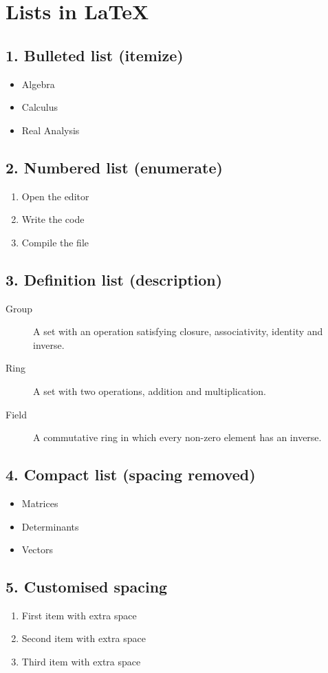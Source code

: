 \documentclass[12pt]{article}
\begin{document}
\section*{Lists in \LaTeX{}}

\subsection*{1. Bulleted list (itemize)}
\begin{itemize}
  \item Algebra
  \item Calculus
  \item Real Analysis
\end{itemize}

\subsection*{2. Numbered list (enumerate)}
\begin{enumerate}
  \item Open the editor
  \item Write the code
  \item Compile the file
\end{enumerate}

\subsection*{3. Definition list (description)}
\begin{description}
  \item[Group] A set with an operation satisfying closure, associativity, identity and inverse.
  \item[Ring] A set with two operations, addition and multiplication.
  \item[Field] A commutative ring in which every non-zero element has an inverse.
\end{description}

\subsection*{4. Compact list (spacing removed)}
\begin{itemize}[noitemsep]
  \item Matrices
  \item Determinants
  \item Vectors
\end{itemize}

\subsection*{5. Customised spacing}
\begin{enumerate}[itemsep=10pt, topsep=5pt]
  \item First item with extra space
  \item Second item with extra space
  \item Third item with extra space
\end{enumerate}
\end{document}
